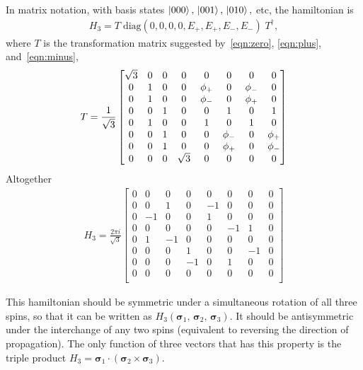In matrix notation, with basis states $\left|000\right\rangle,\,\left|001\right\rangle,\,\left|010\right\rangle,$ etc, the hamiltonian is 
\begin{align}
H_3 = T\; \text{diag}(0,0,0,0,E_+,E_+,E_-,E_-)\; T^\dag,
\end{align}
where $T$ is the transformation matrix suggested by~\ref{eqn:zero}, \ref{eqn:plus}, and~\ref{eqn:minus},
\begin{align}
T = \frac{1}{\sqrt{3}}\begin{bmatrix}
\sqrt{3} & 0 & 0 & 0        & 0      & 0      & 0      & 0      \\
0        & 1 & 0 & 0        & \phi_+ & 0      & \phi_- & 0      \\
0        & 1 & 0 & 0        & \phi_- & 0      & \phi_+ & 0      \\
0        & 0 & 1 & 0        & 0      & 1      & 0      & 1      \\
0        & 1 & 0 & 0        & 1      & 0      & 1      & 0      \\
0        & 0 & 1 & 0        & 0      & \phi_- & 0      & \phi_+ \\
0        & 0 & 1 & 0        & 0      & \phi_+ & 0      & \phi_- \\
0        & 0 & 0 & \sqrt{3} & 0      & 0      & 0      & 0
\end{bmatrix}
\end{align}
Altogether
\begin{align}
H_3 = \frac{2\pi i}{\sqrt{3}}\begin{bmatrix}
0 & 0  & 0  & 0  & 0  & 0  & 0  & 0 \\
0 & 0  & 1  & 0  & -1 & 0  & 0  & 0 \\
0 & -1 & 0  & 0  & 1  & 0  & 0  & 0 \\
0 & 0  & 0  & 0  & 0  & -1 & 1  & 0 \\
0 & 1  & -1 & 0  & 0  & 0  & 0  & 0 \\
0 & 0  & 0  & 1  & 0  & 0  & -1 & 0 \\
0 & 0  & 0  & -1 & 0  & 1  & 0  & 0 \\
0 & 0  & 0  & 0  & 0  & 0  & 0  & 0 \\
\end{bmatrix}
\end{align}

This hamiltonian should be symmetric under a simultaneous rotation of all three spins, so that it can be written as $H_3(\bm{\sigma}_1,\,\bm{\sigma}_2 ,\,\bm{\sigma}_3)$. It should be antisymmetric under the interchange of any two spins (equivalent to reversing the direction of propagation). The only function of three vectors that has this property is the triple product $H_3= \bm{\sigma}_1\cdot\left(\bm{\sigma}_2 \times\bm{\sigma}_3\right)$.

